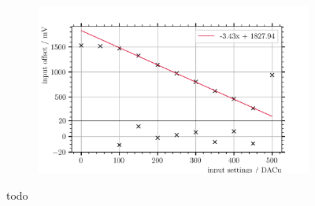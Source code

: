 \begin{figure}
	\begin{subfigure}[b]{1.\textwidth}
		\centering
		\includegraphics[width=1.\textwidth]{pictures/input_offset_board_2_channel_0.png}
		\caption{}
		\label{fig:input_offset_b2_dac50}
	\end{subfigure}
	\caption[todo]{todo}
	\label{fig:input_offset_b2_dac}
\end{figure}


